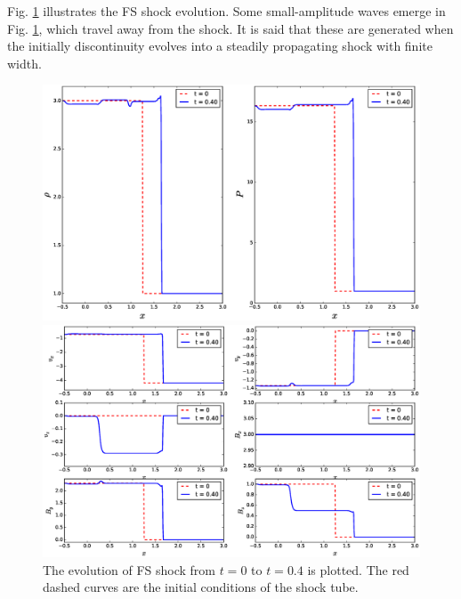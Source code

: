 \documentclass[10.5pt]{article}
\begin{document}
Fig. \ref{fig: FS test} illustrates the FS shock evolution. Some small-amplitude waves emerge in 
Fig. \ref{fig: FS test}, which travel away from the shock. It is said that these are 
generated when the initially discontinuity
evolves into a steadily propagating shock with finite width.
\begin{figure}[ht]
	\centering
	\begin{minipage}[c]{0.9\textwidth}
		\includegraphics[width=1\textwidth]{FS1.eps}
	\end{minipage}
	\begin{minipage}[c]{0.9\textwidth}
		\includegraphics[width=1\textwidth]{FS2.eps}
	\end{minipage}%
\caption{The evolution of FS shock from $t=0$ to $t=0.4$ is plotted. 
The red dashed curves are the initial conditions of the shock tube.}
\label{fig: FS test}
\end{figure}
\end{document}
